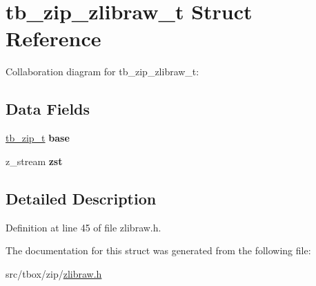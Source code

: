 \hypertarget{structtb__zip__zlibraw__t}{\section{tb\-\_\-zip\-\_\-zlibraw\-\_\-t Struct Reference}
\label{structtb__zip__zlibraw__t}
}


Collaboration diagram for tb\-\_\-zip\-\_\-zlibraw\-\_\-t\-:
\subsection*{Data Fields}
\begin{DoxyCompactItemize}
\item 
\hypertarget{structtb__zip__zlibraw__t_aa2eb8d47d4b2929bb580e284023b70ca}{\hyperlink{structtb__zip__t}{tb\-\_\-zip\-\_\-t} {\bfseries base}}\label{structtb__zip__zlibraw__t_aa2eb8d47d4b2929bb580e284023b70ca}

\item 
\hypertarget{structtb__zip__zlibraw__t_af8c1f966a17cc2385df8347a12c616fe}{z\-\_\-stream {\bfseries zst}}\label{structtb__zip__zlibraw__t_af8c1f966a17cc2385df8347a12c616fe}

\end{DoxyCompactItemize}


\subsection{Detailed Description}


Definition at line 45 of file zlibraw.\-h.



The documentation for this struct was generated from the following file\-:\begin{DoxyCompactItemize}
\item 
src/tbox/zip/\hyperlink{zlibraw_8h}{zlibraw.\-h}\end{DoxyCompactItemize}
